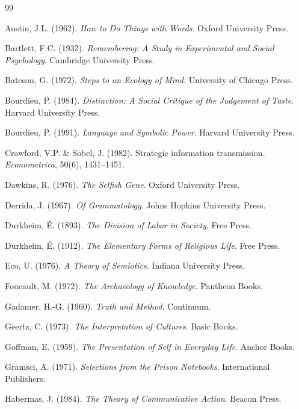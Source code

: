 \documentclass[11pt,twoside]{book}
\theoremstyle{plain}
\theoremstyle{definition}
\theoremstyle{remark}
\begin{document}
\begin{thebibliography}{99}

 Austin, J.L. (1962). \textit{How to Do Things with Words}. Oxford University Press.

 Bartlett, F.C. (1932). \textit{Remembering: A Study in Experimental and Social Psychology}. Cambridge University Press.

 Bateson, G. (1972). \textit{Steps to an Ecology of Mind}. University of Chicago Press.

 Bourdieu, P. (1984). \textit{Distinction: A Social Critique of the Judgement of Taste}. Harvard University Press.

 Bourdieu, P. (1991). \textit{Language and Symbolic Power}. Harvard University Press.

 Crawford, V.P. \& Sobel, J. (1982). Strategic information transmission. \textit{Econometrica}, 50(6), 1431--1451.

 Dawkins, R. (1976). \textit{The Selfish Gene}. Oxford University Press.

 Derrida, J. (1967). \textit{Of Grammatology}. Johns Hopkins University Press.

 Durkheim, \'E. (1893). \textit{The Division of Labor in Society}. Free Press.

 Durkheim, \'E. (1912). \textit{The Elementary Forms of Religious Life}. Free Press.

 Eco, U. (1976). \textit{A Theory of Semiotics}. Indiana University Press.

 Foucault, M. (1972). \textit{The Archaeology of Knowledge}. Pantheon Books.

 Gadamer, H.-G. (1960). \textit{Truth and Method}. Continuum.

 Geertz, C. (1973). \textit{The Interpretation of Cultures}. Basic Books.

 Goffman, E. (1959). \textit{The Presentation of Self in Everyday Life}. Anchor Books.

 Gramsci, A. (1971). \textit{Selections from the Prison Notebooks}. International Publishers.

 Habermas, J. (1984). \textit{The Theory of Communicative Action}. Beacon Press.


\end{thebibliography}
\end{document}
